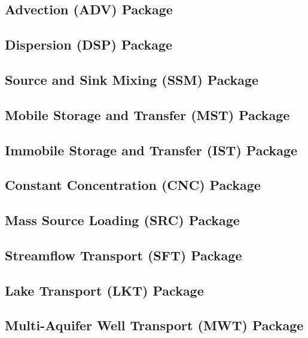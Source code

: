 \newpage
\subsection{Advection (ADV) Package}


\newpage
\subsection{Dispersion (DSP) Package}


\newpage
\subsection{Source and Sink Mixing (SSM) Package}


\newpage
\subsection{Mobile Storage and Transfer (MST) Package}


\newpage
\subsection{Immobile Storage and Transfer (IST) Package}


\newpage
\subsection{Constant Concentration (CNC) Package}


\newpage
\subsection{Mass Source Loading (SRC) Package}


\newpage
\subsection{Streamflow Transport (SFT) Package}


\newpage
\subsection{Lake Transport (LKT) Package}


\newpage
\subsection{Multi-Aquifer Well Transport (MWT) Package}


